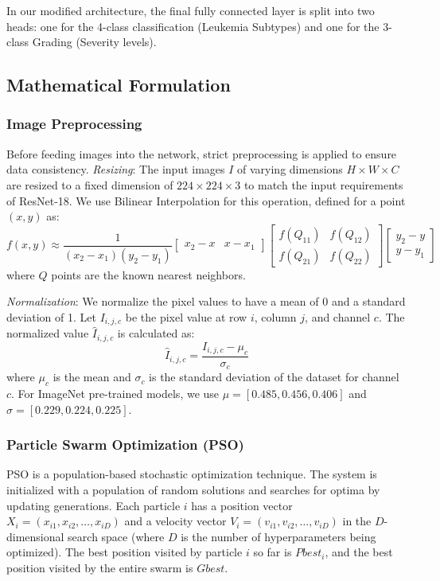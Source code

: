 \documentclass[12pt, a4paper]{article}
\begin{document}
In our modified architecture, the final fully connected layer is split into two heads: one for the 4-class classification (Leukemia Subtypes) and one for the 3-class Grading (Severity levels).

\subsection{Mathematical Formulation}

\subsubsection{Image Preprocessing}
Before feeding images into the network, strict preprocessing is applied to ensure data consistency.
\textit{Resizing}: The input images $I$ of varying dimensions $H \times W \times C$ are resized to a fixed dimension of $224 \times 224 \times 3$ to match the input requirements of ResNet-18. We use Bilinear Interpolation for this operation, defined for a point $(x, y)$ as:
\begin{equation}
f(x, y) \approx \frac{1}{(x_2-x_1)(y_2-y_1)} \begin{bmatrix} x_2-x & x-x_1 \end{bmatrix} \begin{bmatrix} f(Q_{11}) & f(Q_{12}) \\ f(Q_{21}) & f(Q_{22}) \end{bmatrix} \begin{bmatrix} y_2-y \\ y-y_1 \end{bmatrix}
\end{equation}
where $Q$ points are the known nearest neighbors.

\textit{Normalization}: We normalize the pixel values to have a mean of 0 and a standard deviation of 1. Let $I_{i,j,c}$ be the pixel value at row $i$, column $j$, and channel $c$. The normalized value $\hat{I}_{i,j,c}$ is calculated as:
\begin{equation}
\hat{I}_{i,j,c} = \frac{I_{i,j,c} - \mu_c}{\sigma_c}
\end{equation}
where $\mu_c$ is the mean and $\sigma_c$ is the standard deviation of the dataset for channel $c$. For ImageNet pre-trained models, we use $\mu = [0.485, 0.456, 0.406]$ and $\sigma = [0.229, 0.224, 0.225]$.

\subsubsection{Particle Swarm Optimization (PSO)}
PSO is a population-based stochastic optimization technique. The system is initialized with a population of random solutions and searches for optima by updating generations.
Each particle $i$ has a position vector $X_i = (x_{i1}, x_{i2}, \dots, x_{iD})$ and a velocity vector $V_i = (v_{i1}, v_{i2}, \dots, v_{iD})$ in the $D$-dimensional search space (where $D$ is the number of hyperparameters being optimized).
The best position visited by particle $i$ so far is $Pbest_i$, and the best position visited by the entire swarm is $Gbest$.
\end{document}
